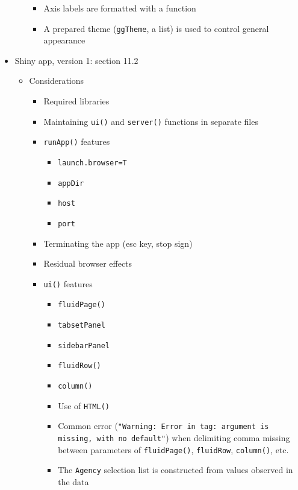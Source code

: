 \documentclass[10pt, letterpaper]{article}
\begin{document}
\begin{spacing}{1.0}
\begin{itemize}
\begin{itemize}
\begin{itemize}
          \item Axis labels are formatted with a function
          \item A prepared theme (\texttt{ggTheme}, a list) is used to control general appearance 
        \end{itemize}
    \end{itemize}
  \item Shiny app, version 1:  section 11.2
    \begin{itemize}
      \item Considerations
        \begin{itemize}
          \item Required libraries
          \item Maintaining \texttt{ui()} and \texttt{server()} functions in separate files
          \item \texttt{runApp()} features
            \begin{itemize}
              \item \texttt{launch.browser=T}
              \item \texttt{appDir}
              \item \texttt{host}
              \item \texttt{port}
            \end{itemize}
          \item Terminating the app (esc key, stop sign)
          \item Residual browser effects
          \item \texttt{ui()} features
            \begin{itemize}
              \item \texttt{fluidPage()}
              \item \texttt{tabsetPanel}
              \item \texttt{sidebarPanel}
              \item \texttt{fluidRow()}
              \item \texttt{column()}
              \item Use of \texttt{HTML()}
              \item Common error (\texttt{"Warning: Error in tag: argument is missing, with no default"}) when delimiting comma missing between parameters of \texttt{fluidPage()}, \texttt{fluidRow}, \texttt{column()}, etc.
              \item The \texttt{Agency} selection list is constructed from values observed in the data
            \end{itemize}

\end{itemize}
\end{itemize}
\end{itemize}
\end{spacing}
\end{document}

